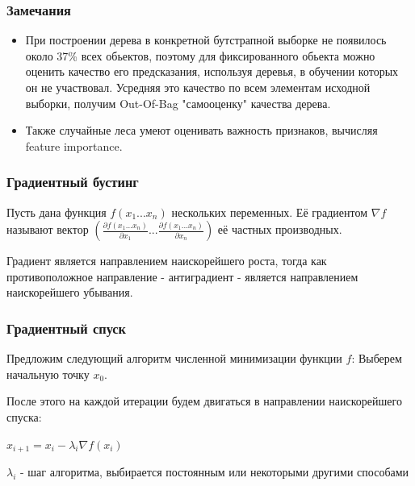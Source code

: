 \documentclass[14pt]{beamer}
\begin{document}
\begin{frame}
\frametitle{Замечания}
        \begin{itemize}
            \item При построении дерева в конкретной бутстрапной выборке не появилось около 37\% всех обьектов, поэтому для фиксированного обьекта можно оценить качество его предсказания, используя деревья, в обучении которых он не участвовал. Усредняя это качество по всем элементам исходной выборки, получим Out-Of-Bag "самооценку" качества дерева. 
            \item Также случайные леса умеют оценивать важность признаков, вычисляя feature importance.
        \end{itemize}
\end{frame}

\begin{frame}
\frametitle{Градиентный бустинг}
        \begin{rudef}
            Пусть дана функция $f(x_1...x_n)$ нескольких переменных. Её градиентом $\nabla f$ называют вектор $(\frac{\partial f(x_1...x_n)}{\partial x_1} ... \frac{\partial f(x_1...x_n)}{\partial x_n})$ её частных производных.
        \end{rudef}
        
        Градиент является направлением наискорейшего роста, тогда как противоположное направление - антиградиент - является направлением наискорейшего убывания. 
        
        
\end{frame}

\begin{frame}
\frametitle{Градиентный спуск}
        Предложим следующий алгоритм численной минимизации функции $f$:
        Выберем начальную точку $x_0$. 
        
        После этого на каждой итерации будем двигаться в направлении наискорейшего спуска:
        
        $x_{i+1} = x_{i} - \lambda_i \nabla f (x_i{})$
        
        $\lambda_i$ - шаг алгоритма, выбирается постоянным или некоторыми другими способами
\end{frame}
\end{document}
